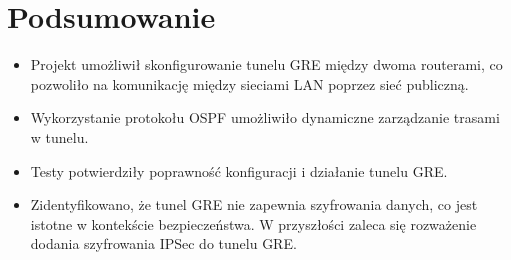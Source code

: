 \documentclass[12pt,twoside,a4paper,openany]{article}
\begin{document}
\section{Podsumowanie}
\begin{itemize}
    \item Projekt umożliwił skonfigurowanie tunelu GRE między dwoma routerami, co pozwoliło na komunikację między sieciami LAN poprzez sieć publiczną.
    \item Wykorzystanie protokołu OSPF umożliwiło dynamiczne zarządzanie trasami w tunelu.
    \item Testy potwierdziły poprawność konfiguracji i działanie tunelu GRE.
    \item Zidentyfikowano, że tunel GRE nie zapewnia szyfrowania danych, co jest istotne w kontekście bezpieczeństwa. W przyszłości zaleca się rozważenie dodania szyfrowania IPSec do tunelu GRE.
\end{itemize}

\newpage
\printbibliography[heading=bibnumbered, label=Literatura, title=Literatura]

\newpage
\hypersetup{linkcolor=black}
\renewcommand{\cftparskip}{3pt}
\clearpage
\renewcommand{\cftloftitlefont}{\Large\bfseries\sffamily}



\todos
\end{document}
